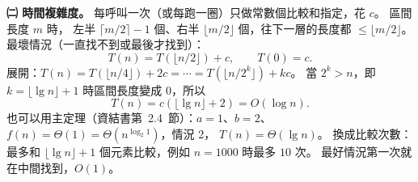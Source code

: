 \begin{pastsoln}
\textbf{㈡ 時間複雜度。} 每呼叫一次（或每跑一圈）只做常數個比較和指定，花 $c$。 區間長度 $m$ 時，
左半 $\lceil m/2 \rceil - 1$ 個、右半 $\lfloor m/2 \rfloor$ 個，往下一層的長度都 $\le \lfloor m/2 \rfloor$。
最壞情況（一直找不到或最後才找到）：
\[
T(n) = T(\lfloor n/2 \rfloor) + c,\qquad T(0) = c.
\]
展開：$T(n) = T(\lfloor n/4 \rfloor) + 2c = \cdots = T(\lfloor n/2^k \rfloor) + kc$。 當
$2^k > n$，即 $k = \lfloor \lg n \rfloor + 1$ 時區間長度變成 $0$，所以
\[
T(n) = c(\lfloor \lg n \rfloor + 2) = O(\log n).
\]
也可以用主定理（資結書第~2.4~節）：$a = 1$、$b = 2$、$f(n) = \Theta(1) = \Theta(n^{\log_2 1})$，情況 2，
$T(n) = \Theta(\lg n)$。 換成比較次數：最多和 $\lfloor \lg n \rfloor + 1$ 個元素比較，例如 $n = 1000$ 時最多
$10$ 次。 最好情況第一次就在中間找到，$O(1)$。
\end{pastsoln}
